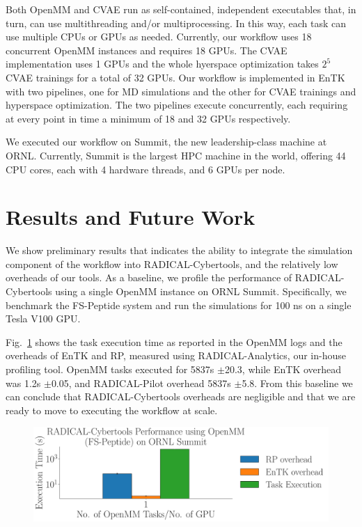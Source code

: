 \documentclass[conference,final]{IEEEtran}
\begin{document}
Both OpenMM and CVAE run as self-contained, independent executables that, in
turn, can use multithreading and/or multiprocessing. In this way, each task
can use multiple CPUs or GPUs as needed. Currently, our workflow uses 18
concurrent OpenMM instances and requires 18 GPUs. The CVAE implementation
uses 1 GPUs and the whole hyerspace optimization takes $2^5$ CVAE trainings
for a total of 32 GPUs. Our workflow is implemented in EnTK with two
pipelines, one for MD simulations and the other for CVAE trainings and
hyperspace optimization. The two pipelines execute concurrently, each
requiring at every point in time a minimum of 18 and 32 GPUs respectively.

We executed our workflow on Summit, the new leadership-class machine at
ORNL\@. Currently, Summit is the largest HPC machine in the world, offering 44
CPU cores, each with 4 hardware threads, and 6 GPUs per node.


\section{Results and Future Work}

We show preliminary results that indicates the ability to integrate the
simulation component of the workflow into RADICAL-Cybertools, and the
relatively low overheads of our tools.  As a baseline, we profile the
performance of RADICAL-Cybertools using a single OpenMM instance on ORNL
Summit. Specifically, we benchmark the FS-Peptide system and run the
simulations for 100 ns on a single Tesla V100 GPU. 

Fig.~\ref{fig:single_openmm} shows the task execution time as reported in the
OpenMM logs and the overheads of EnTK and RP, measured using
RADICAL-Analytics, our in-house profiling tool. OpenMM tasks executed for
5837s $\pm$20.3, while EnTK overhead was 1.2s $\pm$0.05, and
RADICAL-Pilot overhead 5837s $\pm$5.8. From this baseline we can
conclude that RADICAL-Cybertools overheads are negligible and that we are
ready to move to executing the workflow at scale.

\begin{figure}
    \centering
    \includegraphics[width=.8\textwidth]{single_openmm}
    \caption{}
    \label{fig:single_openmm}
\end{figure}





\end{document}

